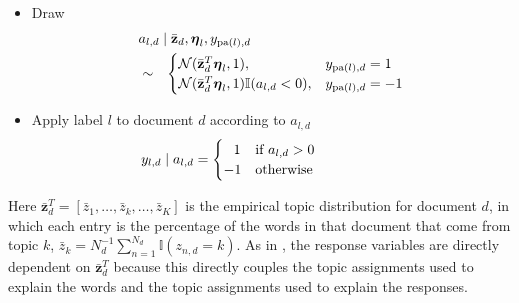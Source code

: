 \begin{shortbox}
\begin{enumerate}
\begin{itemize}
\begin{itemize}
\item Draw 
\begin{eqnarray}\lefteqn{a_{l,d}\mid \bar{\mathbf{z}}_d,\boldsymbol\eta_{l},y_{\mathrm{pa}(l),d}}\nonumber \\&\sim&\begin{cases}
\mathcal{N}(\bar{\mathbf{z}}^{T}_d\boldsymbol\eta_{l},1), & y_{\mathrm{pa}(l),d}=1 \\
\mathcal{N}(\bar{\mathbf{z}}^{T}_d\boldsymbol\eta_{l},1)\mathbb{I}(a_{l,d}<0), & y_{\mathrm{pa}(l),d}=-1 \end{cases}\label{zero_0}\end{eqnarray} %
 
\item Apply label $l$ to document $d$ according to $a_{l,d}$ \begin{eqnarray}\hspace{-2.2cm}
y_{l,d}\mid a_{l,d}=\begin{cases}
\;\;\, 1 & \text{if \ensuremath{a_{l,d}>0}}  \\%
 -1 & \text{otherwise} \end{cases}\label{zero_1}\end{eqnarray}
 
\end{itemize}
\end{itemize}
\end{enumerate}
\label{box:generative_model}
\end{shortbox}

Here $\bar{\mathbf{z}}_d^T = [\bar{z}_{1}, \ldots, \bar{z}_k, \ldots, \bar{z}_K]$ is the empirical topic distribution for document $d$, in which each entry is the percentage of the words in that document that come from topic $k$, $\bar{z}_{k}=N_{d}^{-1}\sum_{n=1}^{N_d}\mathbb{I}(z_{n,d}=k).$  As in \cite{BleiMcAuliffe2008}, the response variables are directly dependent on $\bar{\mathbf{z}}_d^T$ because this directly couples the topic assignments used to explain the words and the topic assignments used to explain the responses.

